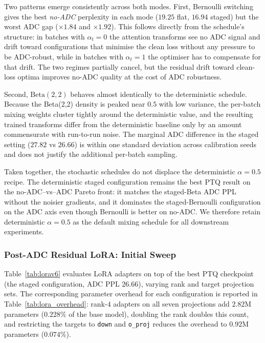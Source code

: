 \documentclass[a4paper,11pt,oneside]{article}
\theoremstyle{breakstyle}
\begin{document}
  Two patterns emerge consistently across both modes.  First,
  Bernoulli switching gives the best \emph{no-ADC} perplexity in
  each mode ($19.25$ flat, $\mathbf{16.94}$ staged) but the worst
  ADC gap ($\times 1.84$ and $\times 1.92$).  This follows directly
  from the schedule's structure: in batches with $\alpha_t = 0$ the
  attention transforms see no ADC signal and drift toward
  configurations that minimise the clean loss without any pressure
  to be ADC-robust, while in batches with $\alpha_t = 1$ the
  optimiser has to compensate for that drift.  The two regimes
  partially cancel, but the residual drift toward clean-loss optima
  improves no-ADC quality at the cost of ADC robustness.

  Second, $\mathrm{Beta}(2,2)$ behaves almost identically to the
  deterministic schedule.  Because the Beta(2,2) density is peaked
  near $0.5$ with low variance, the per-batch mixing weights cluster
  tightly around the deterministic value, and the resulting trained
  transforms differ from the deterministic baseline only by an
  amount commensurate with run-to-run noise.  The marginal ADC
  difference in the staged setting ($27.82$ vs $26.66$) is within
  one standard deviation across calibration seeds and does not
  justify the additional per-batch sampling.

  Taken together, the stochastic schedules do not displace the
  deterministic $\alpha = 0.5$ recipe.  The deterministic staged
  configuration remains the best PTQ result on the
  no-ADC--vs--ADC Pareto front: it matches the staged-Beta ADC PPL
  without the noisier gradients, and it dominates the staged-Bernoulli
  configuration on the ADC axis even though Bernoulli is better on
  no-ADC.  We therefore retain deterministic $\alpha = 0.5$ as the
  default mixing schedule for all downstream experiments.

  \subsubsection{Post-ADC Residual LoRA: Initial Sweep}
  \label{sec:lora_initial}

  Table~\ref{tab:lorav6} evaluates LoRA adapters on top of the best
  PTQ checkpoint (the staged configuration, ADC PPL $26.66$),
  varying rank and target projection sets. The corresponding parameter overhead for each
  configuration is reported in Table~\ref{tab:lora_overhead}: rank-$4$
  adapters on all seven projections add $2.82$M parameters
  ($0.228\%$ of the base model), doubling the rank doubles this
  count, and restricting the targets to \texttt{down} and
  \texttt{o\_proj} reduces the overhead to $0.92$M parameters
  ($0.074\%$).
\end{document}
